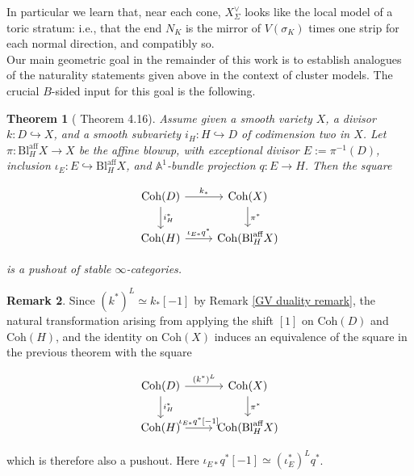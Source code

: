 \documentclass[11pt]{amsart}
\newtheorem{thm}{Theorem}[section]
\theoremstyle{definition}
\newtheorem{rem}[thm]{Remark}
\theoremstyle{remark}
\newcommand{\Coh}{\mathrm{Coh}}
\numberwithin{equation}{section}
\begin{document}
In particular we learn that, near each cone, $X^\vee_\Sigma$ looks like the local model of a toric stratum: i.e., that the end $N_K$ is the mirror of $V(\sigma_K)$ times one strip for each normal direction, and compatibly so.\\

Our main geometric goal in the remainder of this work is to establish analogues of the naturality statements given above in the context of cluster models. The crucial $B$-sided input for this goal is the following.

\begin{thm}[\cite{GL} Theorem 4.16]\label{affine blowup} Assume given a smooth variety $X$, a divisor $k\colon D\hookrightarrow X$, and a smooth subvariety $i_H\colon H\hookrightarrow D$ of codimension two in $X$. Let $\pi\colon\mathrm{Bl}^{\mathrm{aff}}_HX\to X$ be the affine blowup, with exceptional divisor $E:=\pi^{-1}(D)$, inclusion $\iota_E\colon E\hookrightarrow\mathrm{Bl}^{\mathrm{aff}}_HX$, and $\mathbb A^1$-bundle projection $q\colon E\to H$. Then the square

\[\begin{tikzcd}
	\Coh(D) \arrow[r, "k_*"] \arrow[d, "i^*_H"] & \Coh(X) \arrow[d, "\pi^*"] \\
	\Coh(H) \arrow[r, "\iota_{E*}q^* "]& \Coh(\text{Bl}_H^{\text{aff}}X)
\end{tikzcd}\]

\noindent is a pushout of stable $\infty$-categories.
\end{thm}

\begin{rem}
    Since $(k^*)^L\simeq k_*[-1]$ by Remark \ref{GV duality remark}, the natural transformation arising from applying the shift $[1]$ on $\Coh(D)$ and $\Coh(H)$, and the identity on $\Coh(X)$ induces an equivalence of the square in the previous theorem with the square

\[\begin{tikzcd}
	\Coh(D) \arrow[r, "(k^*)^L"] \arrow[d, "i^*_H"] & \Coh(X) \arrow[d, "\pi^*"] \\
	\Coh(H) \arrow[r, "{\iota_{E*}q^*[-1]}"] & \Coh(\text{Bl}_H^{\text{aff}}X)
\end{tikzcd}\]

which is therefore also a pushout. Here $\iota_{E*}q^*[-1]\simeq(\iota_E^*)^Lq^*$.
\end{rem}
\end{document}
